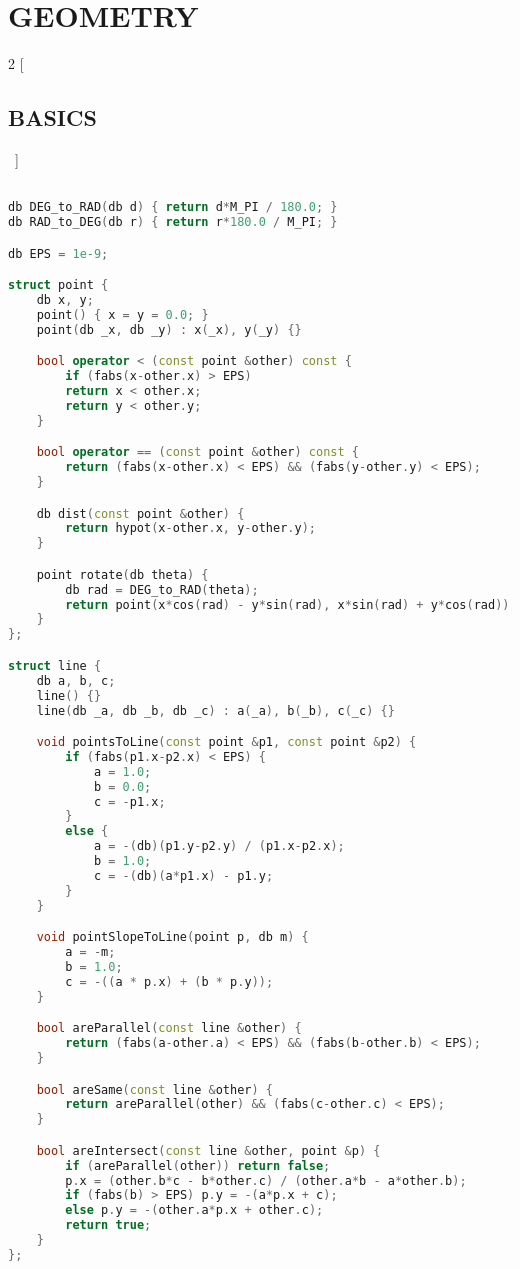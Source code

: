 \documentclass[leter]{amsart}
\begin{document}
\enlargethispage*{\baselineskip}\section{GEOMETRY}
\begin{multicols}{2}
[\subsection{BASICS}\ ]
\begin{lstlisting}[language=C++]

db DEG_to_RAD(db d) { return d*M_PI / 180.0; }
db RAD_to_DEG(db r) { return r*180.0 / M_PI; }

db EPS = 1e-9;

struct point {
    db x, y;
    point() { x = y = 0.0; }
    point(db _x, db _y) : x(_x), y(_y) {}

    bool operator < (const point &other) const { 
        if (fabs(x-other.x) > EPS) 
        return x < other.x;
        return y < other.y; 
    }

    bool operator == (const point &other) const {
        return (fabs(x-other.x) < EPS) && (fabs(y-other.y) < EPS);
    }

    db dist(const point &other) { 
        return hypot(x-other.x, y-other.y);
    }

    point rotate(db theta) { 
        db rad = DEG_to_RAD(theta);
        return point(x*cos(rad) - y*sin(rad), x*sin(rad) + y*cos(rad));
    }
};

struct line {
    db a, b, c;
    line() {}
    line(db _a, db _b, db _c) : a(_a), b(_b), c(_c) {}

    void pointsToLine(const point &p1, const point &p2) {
        if (fabs(p1.x-p2.x) < EPS) {
            a = 1.0;
            b = 0.0;
            c = -p1.x;
        }
        else {
            a = -(db)(p1.y-p2.y) / (p1.x-p2.x);
            b = 1.0;
            c = -(db)(a*p1.x) - p1.y;
        }
    }

    void pointSlopeToLine(point p, db m) {
        a = -m; 
        b = 1.0; 
        c = -((a * p.x) + (b * p.y)); 
    }

    bool areParallel(const line &other) {
        return (fabs(a-other.a) < EPS) && (fabs(b-other.b) < EPS);
    }

    bool areSame(const line &other) {
        return areParallel(other) && (fabs(c-other.c) < EPS);
    }

    bool areIntersect(const line &other, point &p) {
        if (areParallel(other)) return false;
        p.x = (other.b*c - b*other.c) / (other.a*b - a*other.b);
        if (fabs(b) > EPS) p.y = -(a*p.x + c);
        else p.y = -(other.a*p.x + other.c);
        return true;
    }
};


\end{lstlisting}
\end{multicols}
\end{document}
